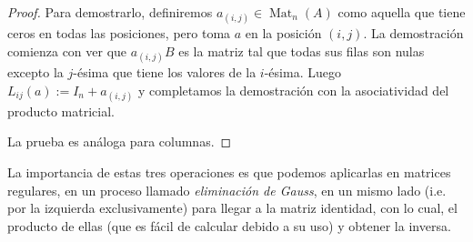 \documentclass[11pt,oneside]{book}
\DeclareMathOperator{\Mat}{Mat}
\begin{document}
\begin{proof}
Para demostrarlo, definiremos $a_{(i,j)}\in\Mat_n(A)$ como aquella que tiene ceros en todas las posiciones, pero toma $a$ en la posición $(i,j)$. La demostración comienza con ver que $a_{(i,j)}B$ es la matriz tal que todas sus filas son nulas excepto la $j$-ésima que tiene los valores de la $i$-ésima. Luego $L_{ij}(a):=I_n+a_{(i,j)}$ y completamos la demostración con la asociatividad del producto matricial.

La prueba es análoga para columnas.
\end{proof}
La importancia de estas tres operaciones es que podemos aplicarlas en matrices regulares, en un proceso llamado \textit{eliminación de Gauss}, en un mismo lado (i.e. por la izquierda exclusivamente) para llegar a la matriz identidad, con lo cual, el producto de ellas (que es fácil de calcular debido a su uso) y obtener la inversa.
\end{document}
